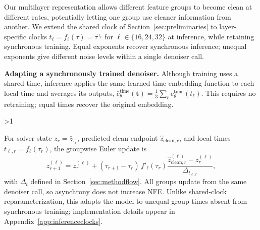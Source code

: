 \documentclass{article}
\newcommand{\rev}[1]{{\color{blue}#1}}
\begin{document}
Our multilayer representation allows different feature groups to become clean at different rates, potentially letting one group use cleaner information from another. We extend the shared clock of Section~\ref{sec:preliminaries} to layer-specific clocks $t_\ell=f_\ell(\tau)=\tau^{\gamma_\ell}$ for $\ell\in\{16,24,32\}$ at inference, while retaining synchronous training. Equal exponents recover synchronous inference; unequal exponents give different noise levels within a single denoiser call.

\textbf{Adapting a synchronously trained denoiser.}
Although training uses a shared time, inference applies the same learned time-embedding function to each local time and averages its outputs, $\bar e_\theta^{\mathrm{time}}(\bm t)=\frac13\sum_\ell e_\theta^{\mathrm{time}}(t_\ell)$. \rev{This requires no retraining; equal times recover the original embedding.}

\par
\ifnum\value{WF@wrappedlines}>1
  \vspace{\dimexpr\value{WF@wrappedlines}\baselineskip\relax}
\fi
\WFclear

For solver state $z_r=\bar z_{\tau_r}$, predicted clean endpoint $\widehat z_{\mathrm{clean},r}$, and local times $t_{\ell,r}=f_\ell(\tau_r)$, the groupwise Euler update is
\begin{equation}
 z_{r+1}^{(\ell)}=z_r^{(\ell)}+
 (\tau_{r+1}-\tau_r)\,f'_\ell(\tau_r)
 \frac{\widehat z_{\mathrm{clean},r}^{(\ell)}-z_r^{(\ell)}}
 {\Delta_{t_{\ell,r}}},
 \label{eq:asyncsampler}
\end{equation}
with $\Delta_t$ defined in Section~\ref{sec:methodflow}. All groups update from the same denoiser call, so asynchrony does not increase NFE. Unlike shared-clock reparameterization, this adapts the model to unequal group times absent from synchronous training; implementation details appear in Appendix~\ref{app:inferenceclocks}.
\end{document}
